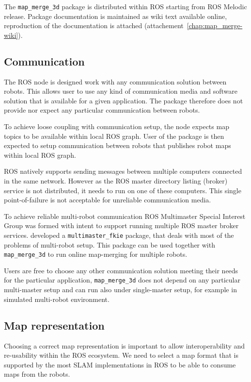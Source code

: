The \texttt{map\_merge\_3d} package is distributed within \gls{ROS} starting from \gls{ROS} Melodic release. Package documentation is maintained as wiki text available online, reproduction of the documentation is attached (attachement~\ref{chap:map_merge-wiki}).

\subsection{Communication}

The \gls{ROS} node is designed work with any communication solution between robots. This allows user to use any kind of communication media and software solution that is available for a given application. The package therefore does not provide nor expect any particular communication between robots.

To achieve loose coupling with communication setup, the node expects map topics to be available within local \gls{ROS} graph. User of the package is then expected to setup communication between robots that publishes robot maps within local \gls{ROS} graph.

\gls{ROS} natively supports sending messages between multiple computers connected in the same network. However as the \gls{ROS} master directory listing (broker) service is not distributed, it needs to run on one of these computers. This single point-of-failure is not acceptable for unreliable communication media.

To achieve reliable multi-robot communication \gls{ROS} Multimaster Special Interest Group was formed with intent to support running multiple \gls{ROS} master broker services. \citet{hernadez2015multi} developed a \texttt{multimaster\_fkie} package, that deals with most of the problems of multi-robot setup. This package can be used together with \texttt{map\_merge\_3d} to run online map-merging for multiple robots.

Users are free to choose any other communication solution meeting their needs for the particular application, \texttt{map\_merge\_3d} does not depend on any particular multi-master setup and can run also under single-master setup, for example in simulated multi-robot environment.

\subsection{Map representation}

Choosing a correct map representation is important to allow interoperability and re-usability within the \gls{ROS} ecosystem. We need to select a map format that is supported by the most \gls{SLAM} implementations in \gls{ROS} to be able to consume maps from the robots.

